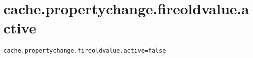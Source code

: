 \section{cache.propertychange.fireoldvalue.active}
\label{configuration:CachePropertychangeFireoldvalueActive}
\AvailableInJavaAndCsharp{\TODO}
\begin{lstlisting}[style=Props,caption={Usage example for \textit{cache.propertychange.fireoldvalue.active}}]
cache.propertychange.fireoldvalue.active=false
\end{lstlisting}